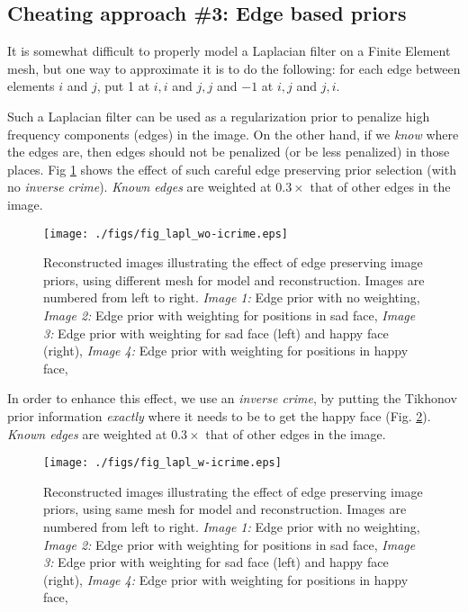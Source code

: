 \documentclass[12pt]{iopart}
\begin{document}
\subsection{ Cheating approach \#3:
             Edge based priors}

It is somewhat difficult to properly model a Laplacian filter
on a Finite Element mesh, but one way to approximate it is to
do the following: for each edge between elements $i$
and $j$, put 1 at $i,i$ and $j,j$
and $-1$ at $i,j$ and $j,i$.

Such a Laplacian filter can be used as a regularization prior
to penalize high frequency components (edges) in the image.
On the other hand, if we {\em know} where the edges are,
then edges should not be penalized (or be less penalized) in
those places. Fig \ref{fig:laplprior}
shows the effect of such careful
edge preserving prior selection (with no {\em inverse crime}).
{\em Known edges} are weighted at $0.3\times$ that of other
edges in the image.

%
%
\begin{figure}[th]
\begin{flushright}
\texttt{[image: ./figs/fig\_lapl\_wo-icrime.eps]}
\caption{\small 
Reconstructed images illustrating the effect of edge
preserving image priors,
using different mesh for model and reconstruction.
Images are numbered from left to right.
{\em Image 1:} Edge prior with no weighting,
{\em Image 2:} Edge prior with weighting for positions in sad face,
{\em Image 3:} Edge prior with weighting for sad face (left) and
happy face (right),
{\em Image 4:} Edge prior with weighting for positions in happy face,
 }
 \label{fig:laplprior}
\end{flushright}
\end{figure}

In order to enhance this effect, we use an {\em inverse crime},
by putting the Tikhonov prior information {\em exactly} where
it needs to be to get the happy face
(Fig. \ref{fig:laplprior-icrime}).
{\em Known edges} are weighted at $0.3\times$ that of other
edges in the image.

%
%
\begin{figure}[th]
\begin{flushright}
\texttt{[image: ./figs/fig\_lapl\_w-icrime.eps]}
\caption{\small 
Reconstructed images illustrating the effect of edge
preserving image priors,
using same mesh for model and reconstruction.
Images are numbered from left to right.
{\em Image 1:} Edge prior with no weighting,
{\em Image 2:} Edge prior with weighting for positions in sad face,
{\em Image 3:} Edge prior with weighting for sad face (left) and
happy face (right),
{\em Image 4:} Edge prior with weighting for positions in happy face,
 }
 \label{fig:laplprior-icrime}
\end{flushright}
\end{figure}
\end{document}
